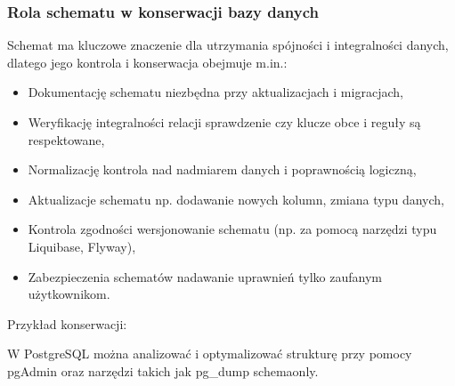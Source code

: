 \documentclass[letterpaper,10pt,polish]{sphinxmanual}
\begin{document}
\subsubsection{Rola schematu w konserwacji bazy danych}
\label{\detokenize{rozdzial2/Kontrola_i_konserwacja/kontrola_i_konserwacja:rola-schematu-w-konserwacji-bazy-danych}}
\sphinxAtStartPar
Schemat ma kluczowe znaczenie dla utrzymania spójności i integralności danych, dlatego jego kontrola i konserwacja obejmuje m.in.:
\begin{itemize}
\item {} 
\sphinxAtStartPar
Dokumentację schematu \sphinxhyphen{} niezbędna przy aktualizacjach i migracjach,

\item {} 
\sphinxAtStartPar
Weryfikację integralności relacji \sphinxhyphen{} sprawdzenie czy klucze obce i reguły są respektowane,

\item {} 
\sphinxAtStartPar
Normalizację \sphinxhyphen{} kontrola nad nadmiarem danych i poprawnością logiczną,

\item {} 
\sphinxAtStartPar
Aktualizacje schematu \sphinxhyphen{} np. dodawanie nowych kolumn, zmiana typu danych,

\item {} 
\sphinxAtStartPar
Kontrola zgodności \sphinxhyphen{} wersjonowanie schematu (np. za pomocą narzędzi typu Liquibase, Flyway),

\item {} 
\sphinxAtStartPar
Zabezpieczenia schematów \sphinxhyphen{} nadawanie uprawnień tylko zaufanym użytkownikom.

\end{itemize}

\sphinxAtStartPar
Przykład konserwacji:

\sphinxAtStartPar
W PostgreSQL można analizować i optymalizować strukturę przy pomocy pgAdmin oraz narzędzi takich jak pg\_dump \textendash{}schema\sphinxhyphen{}only.
\end{document}
